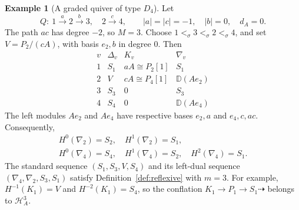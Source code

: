 \documentclass[11pt,a4paper]{article}
\renewcommand{\H}{\mathcal H}
\newcommand{\std}{\Delta}
\newcommand{\costd}{\nabla}
\newcommand{\dual}{\mathbb D}
\theoremstyle{plain}
\theoremstyle{definition}
\newtheorem{example}[theorem]{Example}
\numberwithin{equation}{section}
\begin{document}
\begin{example}[A graded quiver of type $D_4$]\label{ex:d4}
Let
\[
 Q:\ 1\xrightarrow{a}2\xrightarrow{b}3,\quad 2\xrightarrow{c}4,
 \qquad |a|=|c|=-1,\quad |b|=0,\quad d_A=0.
\]
The path $ac$ has degree $-2$, so $M=3$.
Choose $1<_\sigma3<_\sigma2<_\sigma4$, and set
$V=P_2/(cA)$, with basis $e_2,b$ in degree $0$. Then
\begin{equation}\label{eq:d4-objects}
\begin{array}{c|c|c|c}
 v&\std_v&K_v&\costd_v\\ \hline
 1&S_1&aA\cong P_2[1]&S_1\\
 2&V&cA\cong P_4[1]&\dual(Ae_2)\\
 3&S_3&0&S_3\\
 4&S_4&0&\dual(Ae_4)
\end{array}
\end{equation}
The left modules $Ae_2$ and $Ae_4$ have respective bases
$e_2,a$ and $e_4,c,ac$. Consequently,
\begin{equation}\label{eq:d4-cohomology}
 \begin{gathered}
 H^0(\costd_2)=S_2,\quad H^1(\costd_2)=S_1,\\
 H^0(\costd_4)=S_4,\quad H^1(\costd_4)=S_2,\quad
 H^2(\costd_4)=S_1.
 \end{gathered}
\end{equation}
The standard sequence $(S_1,S_3,V,S_4)$ and its left-dual sequence
$(\costd_4,\costd_2,S_3,S_1)$ satisfy
Definition~\ref{def:reflexive} with $m=3$.
For example,
$H^{-1}(K_1)=V$ and $H^{-2}(K_1)=S_4$, so the conflation
$K_1\to P_1\to S_1\dashrightarrow$ belongs to $\H_A^3$.
\end{example}
\end{document}
